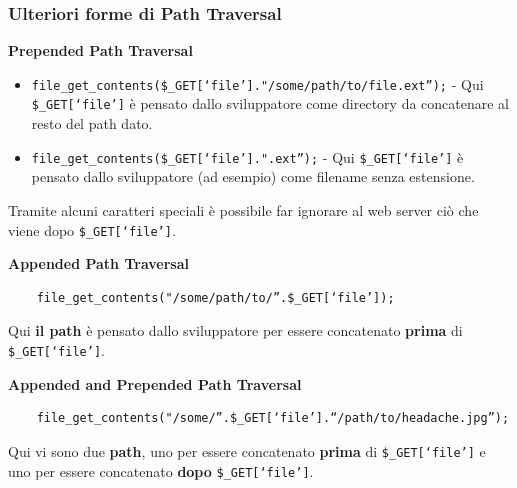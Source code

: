 \documentclass{article}
\begin{document}
\subsubsection{Ulteriori forme di Path Traversal}
\textbf{Prepended Path Traversal}
\begin{itemize}
	\item \verb|file_get_contents($_GET[‘file’]."/some/path/to/file.ext”);| - Qui \verb|$_GET[‘file’]| è pensato dallo sviluppatore come directory da concatenare al resto del path dato.
	
	\item \verb|file_get_contents($_GET[‘file’].".ext”);| - Qui \verb|$_GET[‘file’]| è pensato dallo sviluppatore (ad esempio) come filename senza estensione.
\end{itemize}
Tramite alcuni caratteri speciali è possibile far ignorare al web server ciò che viene dopo \verb|$_GET[‘file’]|.

\newpage

\textbf{Appended Path Traversal}
\begin{verbatim}
	file_get_contents("/some/path/to/”.$_GET[‘file’]);
\end{verbatim}
Qui \textbf{il path} è pensato dallo sviluppatore per essere concatenato \textbf{prima} di \verb|$_GET[‘file’]|.

\textbf{Appended and Prepended Path Traversal}
\begin{verbatim}
	file_get_contents("/some/”.$_GET[‘file’].“/path/to/headache.jpg”);
\end{verbatim}
Qui vi sono due \textbf{path}, uno per essere concatenato \textbf{prima} di \verb|$_GET[‘file’]| e uno per essere concatenato \textbf{dopo} \verb|$_GET[‘file’]|.
\end{document}

